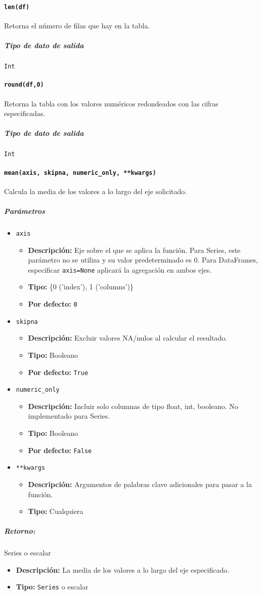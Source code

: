 \paragraph{\texttt{len(df)}} Retorna el número de filas que hay en la tabla.
\subparagraph{Tipo de dato de salida} \texttt{Int}
\paragraph{\texttt{round(df,0)}} Retorna la tabla con los valores numéricos redondeados con las cifras especificadas.
\subparagraph{Tipo de dato de salida} \texttt{Int}
\paragraph{\texttt{mean(axis, skipna, numeric\_only, **kwargs)}} Calcula la media de los valores a lo largo del eje solicitado.
\subparagraph{\textbf{Parámetros}}
\begin{itemize}
\item \texttt{axis}
\begin{itemize}
\item \textbf{Descripción:} Eje sobre el que se aplica la función. Para Series, este parámetro no se utiliza y su valor predeterminado es 0. Para DataFrames, especificar \texttt{axis=None} aplicará la agregación en ambos ejes.
\item \textbf{Tipo:} \{0 ('index'), 1 ('columns')\}
\item \textbf{Por defecto:} \texttt{0}
\end{itemize}
\item \texttt{skipna}
\begin{itemize}
\item \textbf{Descripción:} Excluir valores NA/nulos al calcular el resultado.
\item \textbf{Tipo:} Booleano
\item \textbf{Por defecto:} \texttt{True}
\end{itemize}
\item \texttt{numeric\_only}
\begin{itemize}
\item \textbf{Descripción:} Incluir solo columnas de tipo float, int, booleano. No implementado para Series.
\item \textbf{Tipo:} Booleano
\item \textbf{Por defecto:} \texttt{False}
\end{itemize}
\item \texttt{**kwargs}
\begin{itemize}
\item \textbf{Descripción:} Argumentos de palabras clave adicionales para pasar a la función.
\item \textbf{Tipo:} Cualquiera
\end{itemize}
\end{itemize}
\subparagraph{Retorno:} Series o escalar
\begin{itemize}
\item \textbf{Descripción:} La media de los valores a lo largo del eje especificado.
\item \textbf{Tipo:} \texttt{Series} o escalar
\end{itemize}
